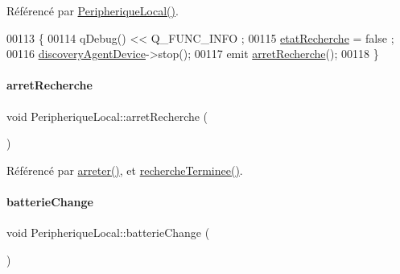Référencé par \hyperlink{class_peripherique_local_a99a652b8659a3692f164cf1a0382e4bf}{Peripherique\+Local()}.


\begin{DoxyCode}
00113 \{
00114     qDebug() << Q\_FUNC\_INFO ;
00115     \hyperlink{class_peripherique_local_a6638c29f6f75c3b4d329d93ae6ea4a48}{etatRecherche} = false ;
00116     \hyperlink{class_peripherique_local_a9e398b7dd89a20b1bee67b8c3467da69}{discoveryAgentDevice}->stop();
00117     emit \hyperlink{class_peripherique_local_a05dad5bf82b579731591407a0c098957}{arretRecherche}();
00118 \}
\end{DoxyCode}
\mbox{\label{class_peripherique_local_a05dad5bf82b579731591407a0c098957}} 
\paragraph{\texorpdfstring{arret\+Recherche}{arretRecherche}}
{\footnotesize\ttfamily void Peripherique\+Local\+::arret\+Recherche (\begin{DoxyParamCaption}{ }\end{DoxyParamCaption})\hspace{0.3cm}{\ttfamily [signal]}}



Référencé par \hyperlink{class_peripherique_local_afbbb6d37b616cc4579486c3b1ce700b2}{arreter()}, et \hyperlink{class_peripherique_local_a16add86080e72a5ce804ff9296e10415}{recherche\+Terminee()}.

\mbox{\label{class_peripherique_local_a19d92cae0098678a5a61f993274687f0}} 
\paragraph{\texorpdfstring{batterie\+Change}{batterieChange}}
{\footnotesize\ttfamily void Peripherique\+Local\+::batterie\+Change (\begin{DoxyParamCaption}{ }\end{DoxyParamCaption})\hspace{0.3cm}{\ttfamily [signal]}}

